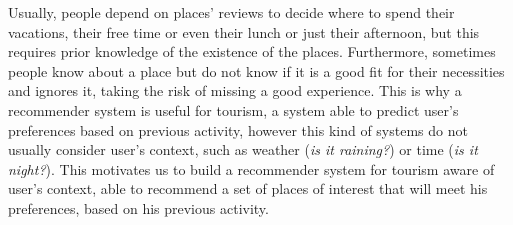 Usually, people depend on places' reviews to decide where to spend their vacations, their free time or even their lunch or just their afternoon, but this requires prior knowledge of the existence of the places. Furthermore, sometimes people know about a place but do not know if it is a good fit for their necessities and ignores it, taking the risk of missing a good experience. This is why a recommender system is useful for tourism, a system able to predict user's preferences based on previous activity, however this kind of systems do not usually consider user's context, such as weather (\textit{is it raining?}) or time (\textit{is it night?}). This motivates us to build a recommender system for tourism aware of user's context, able to recommend a set of places of interest that will meet his preferences, based on his previous activity.

